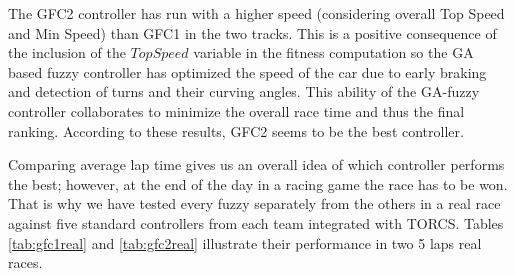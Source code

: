 \documentclass[conference]{IEEEtran}
\begin{document}
The GFC2 controller has run with a higher speed (considering overall Top
Speed and Min Speed) than GFC1 in the two tracks. This is a positive
consequence of the inclusion of the $TopSpeed$ variable in the fitness
computation so the GA based fuzzy controller has optimized the speed
of the car due to early braking and detection of turns and their
curving angles. This ability  of the GA-fuzzy controller collaborates
to minimize the overall race time and thus the final ranking.
According to these results, GFC2 seems to be the best controller.

Comparing average lap time gives us an overall idea of which
controller performs the best; however, at the end of the day in a
racing game the race has to be won. That is why we have tested every
fuzzy separately from the others in a real race against five standard controllers from each team integrated with TORCS. Tables \ref{tab:gfc1real} and \ref{tab:gfc2real}   illustrate their performance in two 5 laps real races. 
\end{document}
